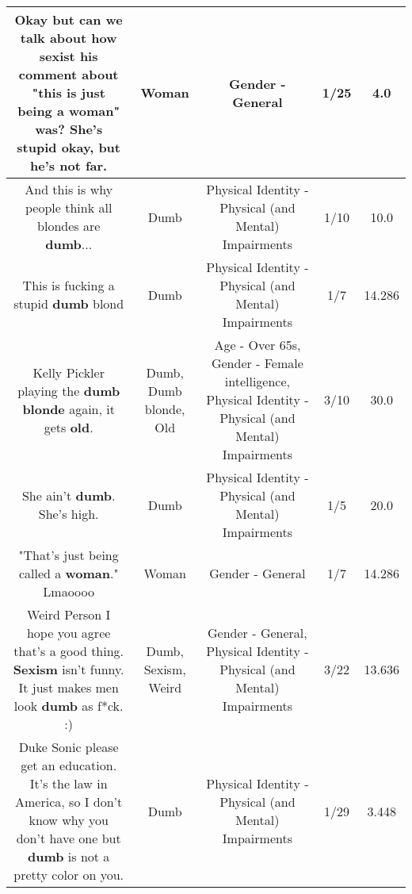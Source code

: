 \documentclass[11pt]{article}
\newlength\mylength
\begin{document}
\begin{center}
\begin{longtable}{|C{.65\mylength}|C{.30\mylength}|C{.12\mylength}|C{.12\mylength}|C{.12\mylength}|}
  \small Okay but can we talk about how sexist his comment about "this is just being a \textbf{woman}" was? She's stupid okay, but he's not far.\normalsize   & Woman & Gender - General & 1/25 & 4.0 \\  \hline
  \small And this is why people think all blondes are \textbf{dumb}...\normalsize   & Dumb & Physical Identity - Physical (and Mental) Impairments & 1/10 & 10.0 \\  \hline
  \small This is fucking a stupid \textbf{dumb} blond\normalsize   & Dumb & Physical Identity - Physical (and Mental) Impairments & 1/7 & 14.286 \\  \hline
  \small Kelly Pickler playing the \textbf{d\textbf{umb} blonde} again, it gets \textbf{old}.\normalsize   & Dumb, Dumb blonde, Old & Age - Over 65s, Gender - Female intelligence, Physical Identity - Physical (and Mental) Impairments & 3/10 & 30.0 \\  \hline
  \small She ain't \textbf{dumb}. She's high.\normalsize   & Dumb & Physical Identity - Physical (and Mental) Impairments & 1/5 & 20.0 \\  \hline
  \small "That's just being called a \textbf{woman}." Lmaoooo\normalsize   & Woman & Gender - General & 1/7 & 14.286 \\  \hline
  \small Weird Person I hope you agree that's a good thing. \textbf{Sexism} isn't funny. It just makes men look \textbf{dumb} as f*ck. :)\normalsize   & Dumb, Sexism, Weird & Gender - General, Physical Identity - Physical (and Mental) Impairments & 3/22 & 13.636 \\  \hline
  \small Duke Sonic please get an education. It's the law in America, so I don't know why you don't have one but \textbf{dumb} is not a pretty color on you.\normalsize   & Dumb & Physical Identity - Physical (and Mental) Impairments & 1/29 & 3.448 \\  \hline

\end{longtable}
\end{center}
\end{document}
